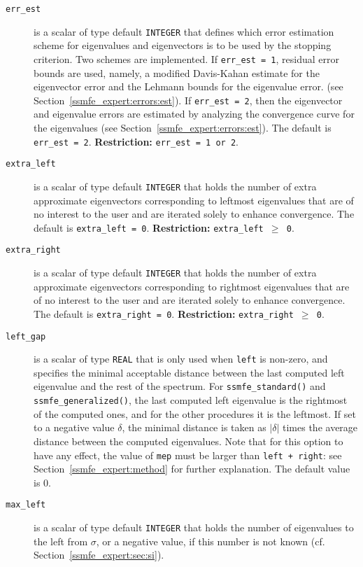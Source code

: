 \begin{description}
%
\item[\texttt{err\_est}] 
is a scalar of type default \texttt{INTEGER} that
defines which error estimation scheme 
for eigenvalues and eigenvectors
is to be used by the stopping criterion.
Two schemes are implemented.
If {\tt err\_est = 1}, residual error bounds are used,
namely,
a modified Davis-Kahan estimate for the eigenvector error
and
the Lehmann bounds for the eigenvalue error.
(see Section~\ref{ssmfe_expert:errors:est}).
If {\tt err\_est = 2}, 
then the eigenvector and eigenvalue errors
are estimated by analyzing the convergence curve
for the eigenvalues (see Section~\ref{ssmfe_expert:errors:est}).
The default is {\tt err\_est = 2}.
{\bf Restriction:} {\tt err\_est = 1 {\rm or} 2}.
%
\item[\texttt{extra\_left}]
is a scalar of type default \texttt{INTEGER} that
holds the number of extra approximate eigenvectors
corresponding to leftmost eigenvalues
that are of no interest to the user
and are iterated solely to enhance convergence.
The default is {\tt extra\_left = 0}.
{\bf Restriction:} {\tt extra\_left $\ge$ 0}.
%
\item[\texttt{extra\_right}]
is a scalar of type default \texttt{INTEGER} that
holds the number of extra approximate eigenvectors
corresponding to rightmost eigenvalues
that are of no interest to the user
and are iterated solely to enhance convergence.
The default is {\tt extra\_right = 0}.
{\bf Restriction:} {\tt extra\_right $\ge$ 0}.
%
\item[\texttt{left\_gap}]
is a scalar of type \texttt{REAL}
that is only used when
{\tt left} is non-zero, and
specifies the minimal acceptable distance
between the last computed left eigenvalue
and the rest of the spectrum.
For {\tt ssmfe\_standard()} and {\tt ssmfe\_generalized()},
the last computed left eigenvalue
is the rightmost of the computed ones,
and for the other procedures
it is the leftmost.
If set to a negative value $\delta$,
the minimal distance is taken as
$|\delta|$ times the average distance between the computed eigenvalues.
Note that for this option to have any effect,
the value of {\tt mep} must be larger than
{\tt left + right}: see Section~\ref{ssmfe_expert:method}
for further explanation.
The default value is 0.
%
\item[\texttt{max\_left}]
is a scalar of type default \texttt{INTEGER} that
holds the number of eigenvalues to the left from $\sigma$,
or a negative value, if this number is not known
(cf. Section~\ref{ssmfe_expert:sec:si}).

\end{description}
